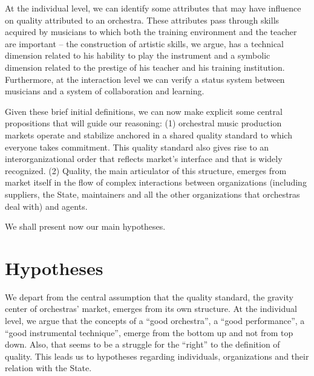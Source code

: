 \documentclass[a4paper, 12pt, openright, oneside, german, french, brazil, english]{abntex2}
\begin{document}
	At the individual level, we can identify some attributes that may have influence on quality attributed to an orchestra. These attributes pass through skills acquired by musicians to which both the training environment and the teacher are important -- the construction of artistic skills, we argue, has a technical dimension related to his hability to play the instrument and a symbolic dimension related to the prestige of his teacher and his training institution. Furthermore, at the interaction level we can verify a status system between musicians and a system of collaboration and learning.
	
	
	Given these brief initial definitions, we can now make explicit some central propositions that will guide our reasoning: (1) orchestral music production markets operate and stabilize anchored in a shared quality standard to which everyone takes commitment. This quality standard also gives rise to an interorganizational order that reflects market's interface and that is widely recognized. (2) Quality, the main articulator of this structure, emerges from market itself in the flow of complex interactions between organizations (including suppliers, the State, maintainers and all the other organizations that orchestras deal with) and agents.
	
	
	We shall present now our main hypotheses.
	
	
	\section{Hypotheses}
	\newtheorem{hip}{Hypothesis}
	
	We depart from the central assumption that the quality standard, the gravity center of orchestras' market, emerges from its own structure. At the individual level, we argue that the concepts of a ``good orchestra'', a ``good performance'', a ``good instrumental technique'', emerge from the bottom up and not from top down. Also, that seems to be a struggle for the ``right'' to the definition of quality. This leads us to hypotheses regarding individuals, organizations and their relation with the State.
	
\end{document}
